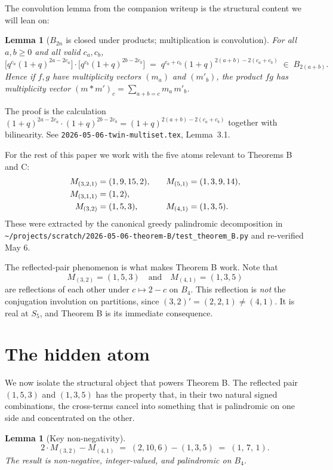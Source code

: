 \documentclass[11pt]{article}
\newtheorem{lemma}[theorem]{Lemma}
\theoremstyle{definition}
\begin{document}
The convolution lemma from the companion writeup is the structural content we will lean on:

\begin{lemma}[$B_{2n}$ is closed under products; multiplication is convolution]\label{lem:conv}
For all $a,b \geq 0$ and all valid $c_a, c_b$,
\[
\bigl[q^{c_a}(1+q)^{2a-2c_a}\bigr] \cdot \bigl[q^{c_b}(1+q)^{2b-2c_b}\bigr] \;=\; q^{c_a+c_b}(1+q)^{2(a+b)-2(c_a+c_b)} \;\in\; B_{2(a+b)}.
\]
Hence if $f, g$ have multiplicity vectors $(m_a)$ and $(m'_b)$, the product $fg$ has multiplicity vector $(m \ast m')_c = \sum_{a+b=c} m_a\, m'_b$.
\end{lemma}

The proof is the calculation $(1+q)^{2a-2c_a} \cdot (1+q)^{2b-2c_b} = (1+q)^{2(a+b)-2(c_a+c_b)}$ together with bilinearity. See \texttt{2026-05-06-twin-multiset.tex}, Lemma~3.1.

For the rest of this paper we work with the five atoms relevant to Theorems B and C:
\begin{align}
M_{(3,2,1)} &= (1,9,15,2), &\quad M_{(5,1)} &= (1,3,9,14), \notag\\
M_{(3,1,1)} &= (1,2), \notag\\
M_{(3,2)} &= (1,5,3), &\quad M_{(4,1)} &= (1,3,5). \label{eq:five-vectors}
\end{align}
These were extracted by the canonical greedy palindromic decomposition in \texttt{\textasciitilde/projects/scratch/2026-05-06-theorem-B/test\_theorem\_B.py} and re-verified May 6.

The reflected-pair phenomenon is what makes Theorem B work. Note that
\[
M_{(3,2)} = (1,5,3) \quad\text{and}\quad M_{(4,1)} = (1,3,5)
\]
are reflections of each other under $c \mapsto 2-c$ on $B_4$. This reflection is \emph{not} the conjugation involution on partitions, since $(3,2)' = (2,2,1) \neq (4,1)$. It is real at $S_5$, and Theorem B is its immediate consequence.

\section{The hidden atom}

We now isolate the structural object that powers Theorem B. The reflected pair $(1,5,3)$ and $(1,3,5)$ has the property that, in their two natural signed combinations, the cross-terms cancel into something that is palindromic on one side and concentrated on the other.

\begin{lemma}[Key non-negativity]\label{lem:atom-RTL}
\[
2\cdot M_{(3,2)} - M_{(4,1)} \;=\; (2,10,6) - (1,3,5) \;=\; (1,\,7,\,1).
\]
The result is non-negative, integer-valued, and palindromic on $B_4$.
\end{lemma}
\end{document}
